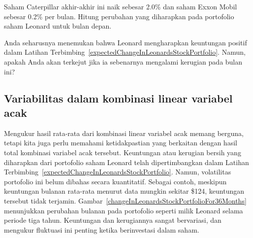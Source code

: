 \begin{exercisewrap}
\begin{nexercise}\label{expectedChangeInLeonardsStockPortfolio}
Saham Caterpillar akhir-akhir ini naik
sebesar 2.0\% dan saham Exxon Mobil sebesar 0.2\% per bulan.
Hitung perubahan yang diharapkan pada portofolio saham Leonard
untuk bulan depan.\footnotemark
\end{nexercise}
\end{exercisewrap}

\begin{exercisewrap}
\begin{nexercise}
Anda seharusnya menemukan bahwa Leonard mengharapkan keuntungan positif
dalam Latihan Terbimbing~\ref{expectedChangeInLeonardsStockPortfolio}.
Namun, apakah Anda akan terkejut jika ia sebenarnya mengalami
kerugian pada bulan ini?\footnotemark
\end{nexercise}
\end{exercisewrap}


\D{\newpage}

\subsection{Variabilitas dalam kombinasi linear variabel acak}
\label{var_lin_combo_of_RVs}

Mengukur hasil rata-rata dari kombinasi linear
variabel acak memang berguna, tetapi kita juga perlu
memahami ketidakpastian yang berkaitan dengan
hasil total kombinasi variabel acak tersebut.
Keuntungan atau kerugian bersih yang diharapkan dari portofolio saham Leonard
telah dipertimbangkan dalam Latihan Terbimbing~\ref{expectedChangeInLeonardsStockPortfolio}.
Namun, volatilitas portofolio ini belum
dibahas secara kuantitatif.
Sebagai contoh, meskipun keuntungan bulanan rata-rata menurut data mungkin
sekitar \$124, keuntungan tersebut tidak terjamin.
Gambar~\ref{changeInLeonardsStockPortfolioFor36Months}
menunjukkan perubahan bulanan pada portofolio seperti milik Leonard selama
periode tiga tahun.
Keuntungan dan kerugiannya sangat bervariasi, dan mengukur
fluktuasi ini penting ketika berinvestasi dalam saham.


